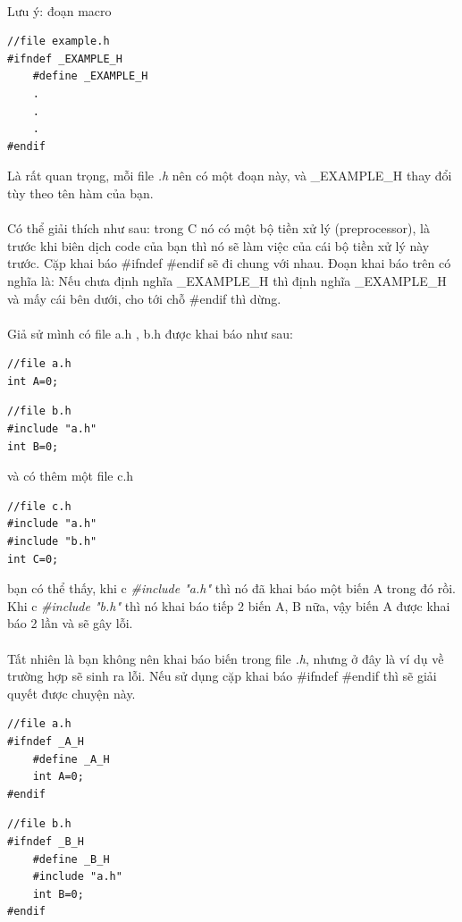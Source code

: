 \documentclass[12pt,a5paper]{book}
\begin{document}
\paragraph{}
Lưu ý: đoạn macro
\begin{lstlisting}
//file example.h
#ifndef _EXAMPLE_H
	#define _EXAMPLE_H
	.
	.
	.
#endif
\end{lstlisting}
Là rất quan trọng, mỗi file \textit{.h} nên có một đoạn này, và \_EXAMPLE\_H thay đổi tùy theo tên hàm của bạn.
\paragraph{}
Có thể giải thích như sau: trong C nó có một bộ tiền xử lý (preprocessor), là trước khi biên dịch code của bạn thì nó sẽ làm việc của cái bộ tiền xử lý này trước. Cặp khai báo \#ifndef \#endif sẽ đi chung với nhau. Đoạn khai báo trên có nghĩa là: Nếu chưa định nghĩa \_EXAMPLE\_H thì định nghĩa \_EXAMPLE\_H và mấy cái bên dưới, cho tới chỗ \#endif thì dừng.
\paragraph{}
Giả sử mình có file a.h , b.h được khai báo như sau:

\begin{lstlisting}
//file a.h
int A=0;
\end{lstlisting}
\begin{lstlisting}
//file b.h
#include "a.h"
int B=0;
\end{lstlisting}
và có thêm một file c.h
\begin{lstlisting}
//file c.h
#include "a.h"
#include "b.h"
int C=0;
\end{lstlisting}
bạn có thể thấy, khi c \textit{\#include "a.h"} thì nó đã khai báo một biến A trong đó rồi. Khi c \textit{\#include "b.h"} thì nó khai báo tiếp 2 biến A, B nữa, vậy biến A được khai báo 2 lần và sẽ gây lỗi.
\paragraph{}
Tất nhiên là bạn không nên khai báo biến trong file \textit{.h}, nhưng ở đây là ví dụ về trường hợp sẽ sinh ra lỗi. Nếu sử dụng cặp khai báo  \#ifndef \#endif thì sẽ giải quyết được chuyện này. 
\begin{lstlisting}
//file a.h
#ifndef _A_H
	#define _A_H
	int A=0;
#endif
\end{lstlisting}
\begin{lstlisting}
//file b.h
#ifndef _B_H
	#define _B_H
	#include "a.h"
	int B=0;
#endif
\end{lstlisting}
\end{document}
